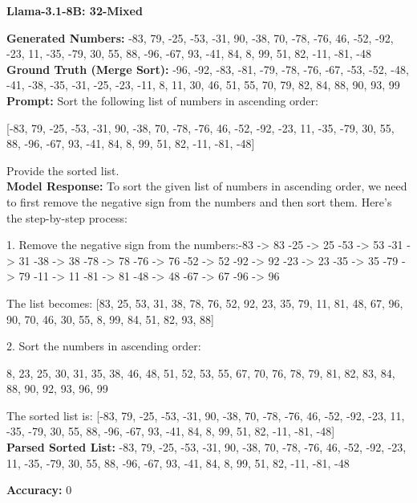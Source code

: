 \begin{figure*}
\begin{AIbox}{\bf{\large Llama-3.1-8B: 32-Mixed}}
\vspace{0.5cm}

\textbf{Generated Numbers:} -83, 79, -25, -53, -31, 90, -38, 70, -78, -76, 46, -52, -92, -23, 11, -35, -79, 30, 55, 88, -96, -67, 93, -41, 84, 8, 99, 51, 82, -11, -81, -48
\\

\textbf{Ground Truth (Merge Sort):} -96, -92, -83, -81, -79, -78, -76, -67, -53, -52, -48, -41, -38, -35, -31, -25, -23, -11, 8, 11, 30, 46, 51, 55, 70, 79, 82, 84, 88, 90, 93, 99
\\

\textbf{Prompt:}
Sort the following list of numbers in ascending order:

[-83, 79, -25, -53, -31, 90, -38, 70, -78, -76, 46, -52, -92, -23, 11, -35, -79, 30, 55, 88, -96, -67, 93, -41, 84, 8, 99, 51, 82, -11, -81, -48]

Provide the sorted list.
\\

\textbf{Model Response:}
To sort the given list of numbers in ascending order, we need to first remove the negative sign from the numbers and then sort them. Here's the step-by-step process:

1. Remove the negative sign from the numbers:-83 -> 83 -25 -> 25 -53 -> 53 -31 -> 31 -38 -> 38 -78 -> 78 -76 -> 76 -52 -> 52 -92 -> 92 -23 -> 23 -35 -> 35 -79 -> 79 -11 -> 11 -81 -> 81 -48 -> 48 -67 -> 67 -96 -> 96

The list becomes: [83, 25, 53, 31, 38, 78, 76, 52, 92, 23, 35, 79, 11, 81, 48, 67, 96, 90, 70, 46, 30, 55, 8, 99, 84, 51, 82, 93, 88]

2. Sort the numbers in ascending order:

8, 23, 25, 30, 31, 35, 38, 46, 48, 51, 52, 53, 55, 67, 70, 76, 78, 79, 81, 82, 83, 84, 88, 90, 92, 93, 96, 99

The sorted list is: [-83, 79, -25, -53, -31, 90, -38, 70, -78, -76, 46, -52, -92, -23, 11, -35, -79, 30, 55, 88, -96, -67, 93, -41, 84, 8, 99, 51, 82, -11, -81, -48]
\\

\textbf{Parsed Sorted List:}
-83, 79, -25, -53, -31, 90, -38, 70, -78, -76, 46, -52, -92, -23, 11, -35, -79, 30, 55, 88, -96, -67, 93, -41, 84, 8, 99, 51, 82, -11, -81, -48

\textbf{Accuracy:} 0


\end{AIbox}
\caption{Incorrect Sorting Example: Model sometimes outputs exact same list}
\end{figure*}
